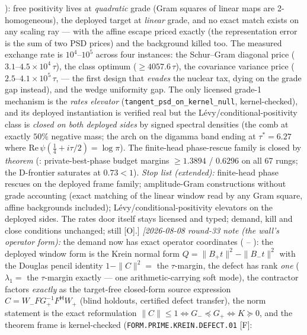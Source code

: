 \documentclass[11pt,a4paper]{article}
\begin{document}
{): free positivity lives
at \emph{quadratic} grade (Gram squares of linear maps are
2-homogeneous), the deployed target at \emph{linear} grade, and
no exact match exists on any scaling ray --- with the affine
escape priced exactly (the representation error is the sum of
two PSD prices) and the background killed too.  The measured
exchange rate is $10^4$--$10^5$ across four instances: the
Schur--Gram diagonal price ($3.1$--$4.5\times10^4\,\tau$), the
class optimum ($\ge 4057.6\,\tau$), the covariance variance
price ($2.5$--$4.1\times10^5\,\tau$,
 --- the first design
that \emph{evades} the nuclear tax, dying on the grade gap
instead), and the wedge uniformity gap.  The only licensed
grade-1 mechanism is the \emph{rates elevator}
(\texttt{tangent\_psd\_on\_kernel\_null}, kernel-checked), and
its deployed instantiation is verified real but the
L\'evy/conditional-positivity class is \emph{closed on both
deployed sides} by signed spectral densities (the comb at
exactly $50\%$ negative mass; the arch on the digamma band
ending at $\tau^* = 6.27$ where
$\mathrm{Re}\,\psi(\tfrac14 + i\tau/2) = \log\pi$).  The
finite-head phase-rescue family is closed by \emph{theorem}
(: private-best-phase
budget margins $\ge 1.3894$ / $0.6296$ on all 67 rungs; the
D-frontier saturates at $0.73 < 1$).  \emph{Stop list
(extended):} finite-head phase rescues on the deployed frame
family; amplitude-Gram constructions without grade accounting
(exact matching of the linear window read by any Gram square,
affine backgrounds included); L\'evy/conditional-positivity
elevators on the deployed sides.  The rates door itself stays
licensed and typed; demand, kill and close conditions
unchanged; still [O].]
\emph{[2026-08-08 round-33 note (the wall's operator form):}
the demand now has exact operator coordinates
( --
): the deployed window form
is the Krein normal form $Q = \|B_+t\|^2 - \|B_-t\|^2$ with the
Douglas pencil identity $1 - \|C\|^2 = $ the $\tau$-margin, the
defect has rank \emph{one} ($\lambda_1 = $ the $\tau$-margin
exactly --- one arithmetic-carrying soft mode), the contractor
factors \emph{exactly} as the target-free closed-form source
expression $C = W_-FG_+^{-1}F^{\mathsf H}W_+$ (blind holdouts,
certified defect transfer), the norm statement is the exact
reformulation $\|C\| \le 1 \Leftrightarrow G_- \preceq G_+
\Leftrightarrow K \succeq 0$, and the theorem frame is
kernel-checked (\texttt{FORM.PRIME.KREIN.DEFECT.01} [F]:
}
\end{document}
